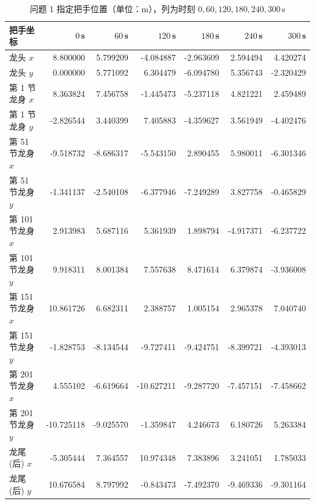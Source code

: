 \documentclass[a4paper, 12pt]{ctexart}
\begin{document}
\begin{table}[H]
  \centering
  \footnotesize
  \setlength{\tabcolsep}{4.5pt}
  \caption{问题 1 指定把手位置（单位：m），列为时刻 $0,60,120,180,240,300\,\mathrm{s}$}
  \label{tab:p1_pos}
  \begin{tabular}{lrrrrrr}
    \toprule
    \textbf{把手坐标} & \textbf{$0\,$s} & \textbf{$60\,$s} & \textbf{$120\,$s} & \textbf{$180\,$s} & \textbf{$240\,$s} & \textbf{$300\,$s} \\
    \midrule
    龙头 $x$ & 8.800000 & 5.799209 & -4.084887 & -2.963609 & 2.594494 & 4.420274 \\
    龙头 $y$ & 0.000000 & 5.771092 & 6.304479 & -6.094780 & 5.356743 & -2.320429 \\
    第 1 节龙身 $x$ & 8.363824 & 7.456758 & -1.445473 & -5.237118 & 4.821221 & 2.459489 \\
    第 1 节龙身 $y$ & -2.826544 & 3.440399 & 7.405883 & -4.359627 & 3.561949 & -4.402476 \\
    第 51 节龙身 $x$ & -9.518732 & -8.686317 & -5.543150 & 2.890455 & 5.980011 & -6.301346 \\
    第 51 节龙身 $y$ & -1.341137 & -2.540108 & -6.377946 & -7.249289 & 3.827758 & -0.465829 \\
    第 101 节龙身 $x$ & 2.913983 & 5.687116 & 5.361939 & 1.898794 & -4.917371 & -6.237722 \\
    第 101 节龙身 $y$ & 9.918311 & 8.001384 & 7.557638 & 8.471614 & 6.379874 & -3.936008 \\
    第 151 节龙身 $x$ & 10.861726 & 6.682311 & 2.388757 & 1.005154 & 2.965378 & 7.040740 \\
    第 151 节龙身 $y$ & -1.828753 & -8.134544 & -9.727411 & -9.424751 & -8.399721 & -4.393013 \\
    第 201 节龙身 $x$ & 4.555102 & -6.619664 & -10.627211 & -9.287720 & -7.457151 & -7.458662 \\
    第 201 节龙身 $y$ & -10.725118 & -9.025570 & -1.359847 & 4.246673 & 6.180726 & 5.263384 \\
    龙尾(后) $x$ & -5.305444 & 7.364557 & 10.974348 & 7.383896 & 3.241051 & 1.785033 \\
    龙尾(后) $y$ & 10.676584 & 8.797992 & -0.843473 & -7.492370 & -9.469336 & -9.301164 \\
    \bottomrule
  \end{tabular}
\end{table}
\end{document}
